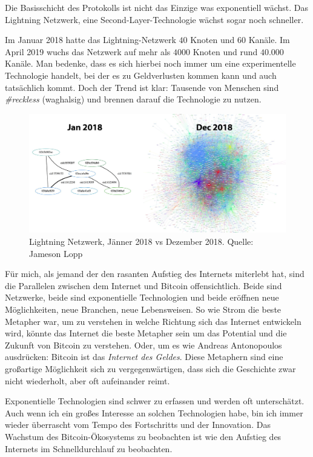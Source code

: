 Die Basisschicht des Protokolls ist nicht das Einzige was exponentiell wächst.
Das Lightning Netzwerk, eine Second-Layer-Technologie wächst sogar noch
schneller.

Im Januar 2018 hatte das Lightning-Netzwerk $40$ Knoten und $60$ Kanäle. Im
April 2019 wuchs das Netzwerk auf mehr als $4000$ Knoten und rund $40.000$
Kanäle. Man bedenke, dass es sich hierbei noch immer um eine experimentelle
Technologie handelt, bei der es zu Geldverlusten kommen kann und auch
tatsächlich kommt. Doch der Trend ist klar: Tausende von Menschen sind
\textit{\#reckless} (waghalsig) und brennen darauf die Technologie zu nutzen.

\begin{figure}
  \includegraphics[width=\textwidth]{assets/images/lnd-growth-lopp-white.png}
  \caption{Lightning Netzwerk, Jänner 2018 vs Dezember 2018. Quelle: Jameson Lopp}
  \label{fig:lnd-growth-lopp-white.png}
\end{figure}

Für mich, als jemand der den rasanten Aufstieg des Internets miterlebt hat, sind
die Parallelen zwischen dem Internet und Bitcoin offensichtlich. Beide sind
Netzwerke, beide sind exponentielle Technologien und beide eröffnen neue
Möglichkeiten, neue Branchen, neue Lebensweisen. So wie Strom die beste Metapher
war, um zu verstehen in welche Richtung sich das Internet entwickeln wird,
könnte das Internet die beste Metapher sein um das Potential und die Zukunft von
Bitcoin zu verstehen. Oder, um es wie Andreas Antonopoulos ausdrücken: Bitcoin
ist das \textit{Internet des Geldes}. Diese Metaphern sind eine großartige
Möglichkeit sich zu vergegenwärtigen, dass sich die Geschichte zwar nicht
wiederholt, aber oft aufeinander reimt.

Exponentielle Technologien sind schwer zu erfassen und werden oft unterschätzt.
Auch wenn ich ein großes Interesse an solchen Technologien habe, bin ich immer
wieder überrascht vom Tempo des Fortschritts und der Innovation. Das Wachstum
des Bitcoin-Ökosystems zu beobachten ist wie den Aufstieg des Internets im
Schnelldurchlauf zu beobachten.

